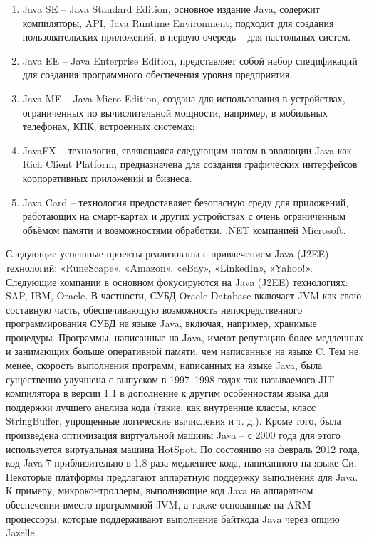 \begin{enumerate}
	\item Java SE – Java Standard Edition, основное издание Java, содержит компиляторы, API, Java Runtime Environment; подходит для создания пользовательских приложений, в первую очередь – для настольных систем.
	\item Java EE – Java Enterprise Edition, представляет собой набор спецификаций для создания программного обеспечения уровня предприятия.
	\item Java ME – Java Micro Edition, создана для использования в устройствах, ограниченных по вычислительной мощности, например, в мобильных телефонах, КПК, встроенных системах;
	\item JavaFX – технология, являющаяся следующим шагом в эволюции Java как Rich Client Platform; предназначена для создания графических интерфейсов корпоративных приложений и бизнеса.
	\item Java Card – технология предоставляет безопасную среду для приложений, работающих на смарт-картах и других устройствах с очень ограниченным объёмом памяти и возможностями обработки. .NET компанией Microsoft.
\end{enumerate}

Следующие успешные проекты реализованы с привлечением Java (J2EE) технологий: «RuneScape», «Amazon», «eBay», «LinkedIn», «Yahoo!».
Следующие компании в основном фокусируются на Java (J2EE) технологиях: SAP, IBM, Oracle. В частности, СУБД Oracle Database включает JVM как свою составную часть, обеспечивающую возможность непосредственного программирования СУБД на языке Java, включая, например, хранимые процедуры.
Программы, написанные на Java, имеют репутацию более медленных и занимающих больше оперативной памяти, чем написанные на языке C. Тем не менее, скорость выполнения программ, написанных на языке Java, была существенно улучшена с выпуском в 1997–1998 годах так называемого JIT-компилятора в версии 1.1 в дополнение к другим особенностям языка для поддержки лучшего анализа кода (такие, как внутренние классы, класс StringBuffer, упрощенные логические вычисления и т. д.). Кроме того, была произведена оптимизация виртуальной машины Java – с 2000 года для этого используется виртуальная машина HotSpot. По состоянию на февраль 2012 года, код Java 7 приблизительно в 1.8 раза медленнее кода, написанного на языке Си.
Некоторые платформы предлагают аппаратную поддержку выполнения для Java. К примеру, микроконтроллеры, выполняющие код Java на аппаратном обеспечении вместо программной JVM, а также основанные на ARM процессоры, которые поддерживают выполнение байткода Java через опцию Jazelle.

